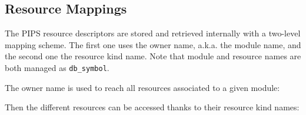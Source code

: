 \documentclass[a4paper]{article}
\begin{document}
\subsection{Resource Mappings}
\label{sec:map}

The PIPS resource descriptors are stored and retrieved internally with
a two-level mapping scheme.  The first one uses the owner name,
a.k.a. the module name, and the second one the resource kind
name. Note that module and resource names are both managed as
\verb/db_symbol/.

The owner name is used to reach all resources associated to a given module:


Then the different resources can be accessed thanks to their resource
kind names: 

\end{document}
